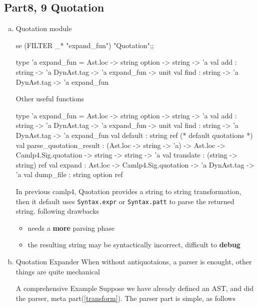 \subsection{Part8, 9 Quotation}
  \begin{enumerate}[(a)]
  \item Quotation module
    \begin{ocamlcode}
      se (FILTER _* "expand_fun") "Quotation";;
    \end{ocamlcode}

    \begin{ocamlcode}
type 'a expand_fun = Ast.loc -> string option -> string -> 'a
val add : string -> 'a DynAst.tag -> 'a expand_fun -> unit
val find : string -> 'a DynAst.tag -> 'a expand_fun      
    \end{ocamlcode}

    Other useful functions 
    \begin{ocamlcode}
type 'a expand_fun = Ast.loc -> string option -> string -> 'a
val add : string -> 'a DynAst.tag -> 'a expand_fun -> unit
val find : string -> 'a DynAst.tag -> 'a expand_fun
val default : string ref  (* default quotations *)
val parse_quotation_result :
      (Ast.loc -> string -> 'a) ->
      Ast.loc -> Camlp4.Sig.quotation -> string -> string -> 'a
val translate : (string -> string) ref
val expand : Ast.loc -> Camlp4.Sig.quotation -> 'a DynAst.tag -> 'a
val dump_file : string option ref
    \end{ocamlcode}

    In previous camlp4, Quotation provides a string to string
    transformation, then it default uses \verb|Syntax.expr| or
    \verb|Syntax.patt| to parse the returned string. following
    drawbacks


    \begin{itemize}
    \item needs a \textbf{more} parsing phase
    \item the resulting string may be syntactically incorrect, difficult
      to \textbf{debug}
    \end{itemize}

\item Quotation Expander 
  When without antiquotaions, a parser is enought, other things are
  quite mechanical

  A comprehensive Example Suppose we have already defined an AST, and
  did the parser, meta part(\ref{transform}).
  The parser part is simple, as follows
\inputminted[fontsize=\scriptsize, fontsize=\scriptsize, firstline=41,lastline=62]{ocaml}{camlp4/code/jake/json.ml}



\end{enumerate}
